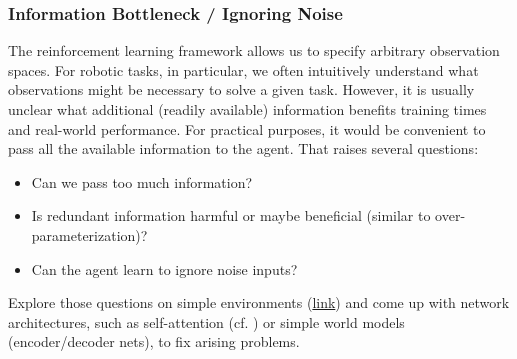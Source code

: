 \documentclass[a4paper]{article}
\begin{document}
\subsubsection{Information Bottleneck / Ignoring Noise}
The reinforcement learning framework allows us to specify arbitrary observation spaces.
For robotic tasks, in particular, we often intuitively understand what observations might be necessary to solve a given task.
However, it is usually unclear what additional (readily available) information benefits training times and real-world performance.
For practical purposes, it would be convenient to pass all the available information to the agent.
That raises several questions:
\begin{itemize}
  \item Can we pass too much information?
  \item Is redundant information harmful or maybe beneficial (similar to over-parameterization)?
  \item Can the agent learn to ignore noise inputs?
\end{itemize}
Explore those questions on simple environments (\href{https://gymnasium.farama.org/environments/mujoco/}{link}) and come up with network architectures, such as self-attention (cf. \citet{Tang2020}) or simple world models (encoder/decoder nets), to fix arising problems.


\end{document}
